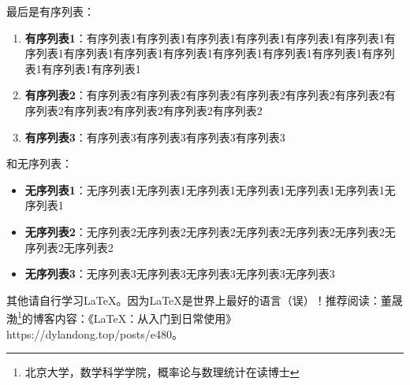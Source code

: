最后是有序列表：
\begin{enumerate}
    \item \textbf{有序列表1}：有序列表1有序列表1有序列表1有序列表1有序列表1有序列表1有序列表1有序列表1有序列表1有序列表1有序列表1有序列表1有序列表1有序列表1有序列表1有序列表1
    \item \textbf{有序列表2}：有序列表2有序列表2有序列表2有序列表2有序列表2有序列表2有序列表2有序列表2有序列表2有序列表2有序列表2
    \item \textbf{有序列表3}：有序列表3有序列表3有序列表3有序列表3
\end{enumerate}

和无序列表：
\begin{itemize}
    \item \textbf{无序列表1}：无序列表1无序列表1无序列表1无序列表1无序列表1无序列表1无序列表1
    \item \textbf{无序列表2}：无序列表2无序列表2无序列表2无序列表2无序列表2无序列表2无序列表2无序列表2
    \item \textbf{无序列表3}：无序列表3无序列表3无序列表3无序列表3无序列表3
\end{itemize}

其他请自行学习\LaTeX{}。因为\LaTeX{}是世界上最好的语言（误）！推荐阅读：董晟渤\footnote{北京大学，数学科学学院，概率论与数理统计在读博士}的博客内容：《LaTeX：从入门到日常使用》https://dylandong.top/posts/e480。
